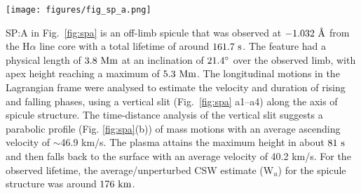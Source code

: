 %
\begin{figure*}
\texttt{[image: figures/fig\_sp\_a.png]}
\caption{Panels (a1) – (a4) show the temporal evolution of candidate spicule feature (SP:A) in the H$\alpha$ passband at four instances, with positions of vertical (cyan) and horizontal (yellow) slits used for the estimation of field-aligned mass flows and CSW respectively. Panel (b) shows the time-distance plot from the vertical slit on the spicule, highlighting the rise- and fall-phases of field-aligned mass flow. The maximum height attained by the visible plasma is marked with the ‘+’ symbol, along with estimated velocities (46.9 km/s, 40.25 km/s). Bottom panel (c) shows an example of Gaussian fit for intensity magnitudes for horizontal slit location (marked as a yellow line on (a1) – (a4)), with error bars, denoting the standard deviation for intensity values. The vertical black line marks the position of the amplitude of Gaussian fit, while shaded-regions mark average/unperturbed width (W$_{u}$) during spicule lifetime and perturbed/instantaneous width (W). This figure is taken from \cite{Dover2020ApJ90572D} and was produced by Dr. Sharma.}
\label{fig:spa} 
\end{figure*}
SP:A in Fig.~\ref{fig:spa} is an off-limb spicule that was observed at $-1.032~\textup{\AA}$ from the H$\alpha$ line core with a total lifetime of around $161.7~\rm{s}$. The feature had a physical length of $3.8~\rm{Mm}$ at an inclination of $21.4^{\circ}$ over the observed limb, with apex height reaching a maximum of $5.3~\rm{Mm}$. The longitudinal motions in the Lagrangian frame were analysed to estimate the velocity and duration of rising and falling phases, using a vertical slit (Fig.~\ref{fig:spa} a1–a4) along the axis of spicule structure. The time-distance analysis of the vertical slit suggests a parabolic profile (Fig. \ref{fig:spa}(b)) of mass motions with an average ascending velocity of $\sim$46.9 km/s. The plasma attains the maximum height in about $81~\rm{s}$ and then falls back to the surface with an average velocity of 40.2 km/s. For the observed lifetime, the average/unperturbed CSW estimate (W$_{u}$) for the spicule structure was around $176~\rm{km}$.
